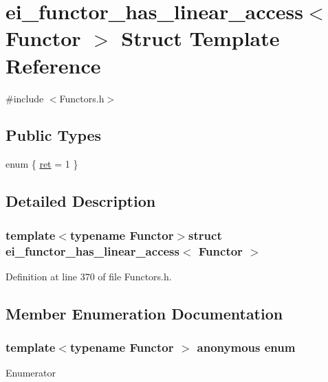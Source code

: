 \hypertarget{structei__functor__has__linear__access}{\section{ei\-\_\-functor\-\_\-has\-\_\-linear\-\_\-access$<$ Functor $>$ Struct Template Reference}
\label{structei__functor__has__linear__access}
}


{\ttfamily \#include $<$Functors.\-h$>$}

\subsection*{Public Types}
\begin{DoxyCompactItemize}
\item 
enum \{ \hyperlink{structei__functor__has__linear__access_a1e237be8b15a00ca59ba2d1f5acf81ecac7ef0ac15352cab486664153dc9cea8a}{ret} = 1
 \}
\end{DoxyCompactItemize}


\subsection{Detailed Description}
\subsubsection*{template$<$typename Functor$>$struct ei\-\_\-functor\-\_\-has\-\_\-linear\-\_\-access$<$ Functor $>$}



Definition at line 370 of file Functors.\-h.



\subsection{Member Enumeration Documentation}
\hypertarget{structei__functor__has__linear__access_a1e237be8b15a00ca59ba2d1f5acf81ec}{\subsubsection[{anonymous enum}]{\setlength{\rightskip}{0pt plus 5cm}template$<$typename Functor $>$ anonymous enum}}\label{structei__functor__has__linear__access_a1e237be8b15a00ca59ba2d1f5acf81ec}
\begin{Desc}
\item[Enumerator]\par
\begin{description}
\item[{\em 
\hypertarget{structei__functor__has__linear__access_a1e237be8b15a00ca59ba2d1f5acf81ecac7ef0ac15352cab486664153dc9cea8a}{ret}\label{structei__functor__has__linear__access_a1e237be8b15a00ca59ba2d1f5acf81ecac7ef0ac15352cab486664153dc9cea8a}
}]\end{description}
\end{Desc}


